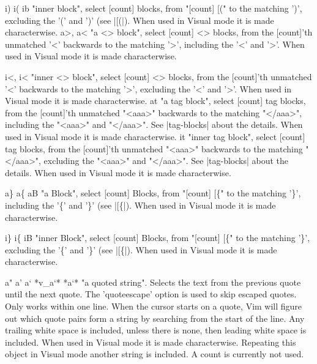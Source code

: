 \documentclass{beamer}
\begin{document}
\begin{frame}
        i) i(   ib          "inner block", select [count] blocks, from "[count] [("
          to the matching ')', excluding the '(' and ')' (see
          |[(|).
            When used in Visual mode it is made characterwise.
            a>, a<          "a <> block", select [count] <> blocks, from the
            [count]'th unmatched '<' backwards to the matching
            '>', including the '<' and '>'.
            When used in Visual mode it is made characterwise.

            i<, i<          "inner <> block", select [count] <> blocks, from
            the [count]'th unmatched '<' backwards to the matching
            '>', excluding the '<' and '>'.
            When used in Visual mode it is made characterwise.
            at          "a tag block", select [count] tag blocks, from the
            [count]'th unmatched "<aaa>" backwards to the matching
            "</aaa>", including the "<aaa>" and "</aaa>".
            See |tag-blocks| about the details.
            When used in Visual mode it is made characterwise.
            it          "inner tag block", select [count] tag blocks, from the
            [count]'th unmatched "<aaa>" backwards to the matching
            "</aaa>", excluding the "<aaa>" and "</aaa>".
            See |tag-blocks| about the details.
            When used in Visual mode it is made characterwise.

          a\} a\{   aB          "a Block", select [count] Blocks, from "[count] [\{" to
              the matching '\}', including the '\{' and '\}' (see
              |[\{|).
                  When used in Visual mode it is made characterwise.

                i\}         i\{ iB          "inner Block", select [count] Blocks, from "[count] [\{"
                    to the matching '\}', excluding the '\{' and '\}' (see
                    |[\{|).
                        When used in Visual mode it is made characterwise.

                        a" a'   a`                          *v\_a`* *a`*
                        "a quoted string".  Selects the text from the previous
                        quote until the next quote.  The 'quoteescape' option
                        is used to skip escaped quotes.
                        Only works within one line.
                        When the cursor starts on a quote, Vim will figure out
                        which quote pairs form a string by searching from the
                        start of the line.
                        Any trailing white space is included, unless there is
                        none, then leading white space is included.
                        When used in Visual mode it is made characterwise.
                        Repeating this object in Visual mode another string is
                        included.  A count is currently not used.


\end{frame}
\end{document}
